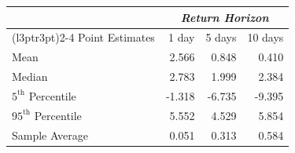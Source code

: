 
\begin{tabular}{lrrr}
\toprule
\multicolumn{1}{c}{\em{ }} & \multicolumn{3}{c}{\em{Return Horizon}} \\
\cmidrule(l{3pt}r{3pt}){2-4}
Point Estimates & 1 day & 5 days & 10 days\\
\midrule
Mean & 2.566 & 0.848 & 0.410\\
Median & 2.783 & 1.999 & 2.384\\
$5^\text{th}$ Percentile & -1.318 & -6.735 & -9.395\\
$95^\text{th}$ Percentile & 5.552 & 4.529 & 5.854\\
\midrule
Sample Average & 0.051 & 0.313 & 0.584\\
\bottomrule
\end{tabular}
